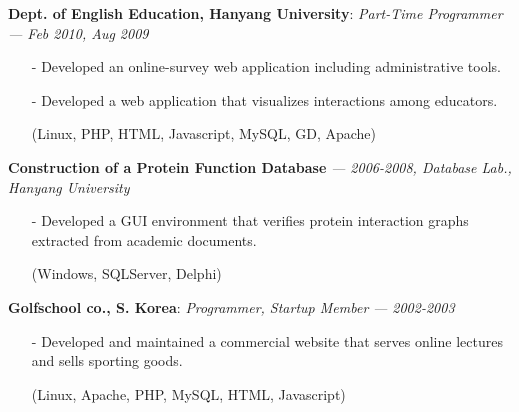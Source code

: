   \vspace{-0.15in}
{\bf Dept. of English Education, Hanyang University}: \emph{Part-Time Programmer}
  {\it \footnotesize --- Feb 2010, Aug 2009}
  \begin{itemize}[leftmargin=*]
    \setlength\itemsep{-0.02in}
     \item[-] Developed an online-survey web application including administrative tools.
     \item[-] Developed a web application that visualizes interactions among educators.
     \item[] {\small(Linux, PHP, HTML, Javascript, MySQL, GD, Apache)}
  \end{itemize}

  \vspace{-0.15in}
  {\bf Construction of a Protein Function Database} 
    {\it \footnotesize --- 2006-2008, Database Lab., Hanyang University}
    \begin{itemize}[leftmargin=*]
    \setlength\itemsep{-0.02in}
    \item[-] Developed a GUI environment that verifies protein interaction graphs extracted
    from academic documents.
    \item[] {\small(Windows, SQLServer, Delphi)}
    \end{itemize}

    
  \vspace{-0.15in}
  {\bf Golfschool co., S. Korea}: \emph{Programmer, Startup Member}
    {\it \footnotesize --- 2002-2003}
    \begin{itemize}[leftmargin=*]
    \setlength\itemsep{-0.02in}
     \item[-] Developed and maintained a commercial website that serves online lectures and sells sporting goods.
     \item[]  {\small(Linux, Apache, PHP, MySQL, HTML, Javascript)}
    \end{itemize}

